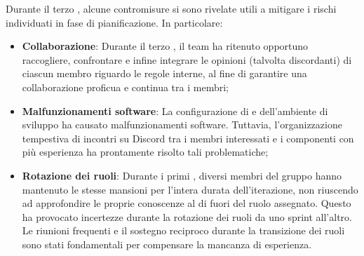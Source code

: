 \vspace{0.5\baselineskip}
\par Durante il terzo , alcune contromisure si sono rivelate utili a mitigare i rischi individuati in fase di pianificazione. In particolare:
\begin{itemize}
  \item \textbf{Collaborazione}: Durante il terzo , il team ha ritenuto opportuno raccogliere, confrontare e infine integrare le opinioni (talvolta discordanti) di ciascun membro riguardo le regole interne, al fine di garantire una collaborazione proficua e continua tra i membri;
  \item \textbf{Malfunzionamenti software}: La configurazione di  e dell'ambiente di sviluppo ha causato malfunzionamenti software. Tuttavia, l'organizzazione tempestiva di incontri su Discord tra i membri interessati e i componenti con più esperienza ha prontamente risolto tali problematiche;
  \item \textbf{Rotazione dei ruoli}: Durante i primi , diversi membri del gruppo hanno mantenuto le stesse mansioni per l'intera durata dell'iterazione, non riuscendo ad approfondire le proprie conoscenze al di fuori del ruolo assegnato. Questo ha provocato incertezze durante la rotazione dei ruoli da uno sprint all'altro. Le riunioni frequenti e il sostegno reciproco durante la transizione dei ruoli sono stati fondamentali per compensare la mancanza di esperienza.
\end{itemize}
